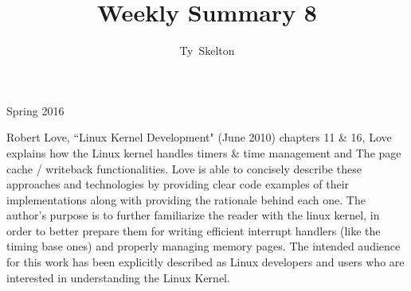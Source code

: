 \documentclass[10pt,draftclsnofoot,onecolumn]{IEEEtran}
\begin{document}
\singlespacing
\title{Weekly Summary 8}

\author{Ty~Skelton}

{Spring 2016}

\maketitle
\IEEEpeerreviewmaketitle

Robert Love, ``Linux Kernel Development" (June 2010) chapters 11 \& 16, Love explains how the Linux kernel handles timers \& time management and The page cache / writeback functionalities.
Love is able to concisely describe these approaches and technologies by providing clear code examples of their implementations along with providing the rationale behind each one.
The author's purpose is to further familiarize the reader with the linux kernel, in order to better prepare them for writing efficient interrupt handlers (like the timing base ones) and properly managing memory pages.
The intended audience for this work has been explicitly described as Linux developers and users who are interested in understanding the Linux Kernel.
\end{document}
